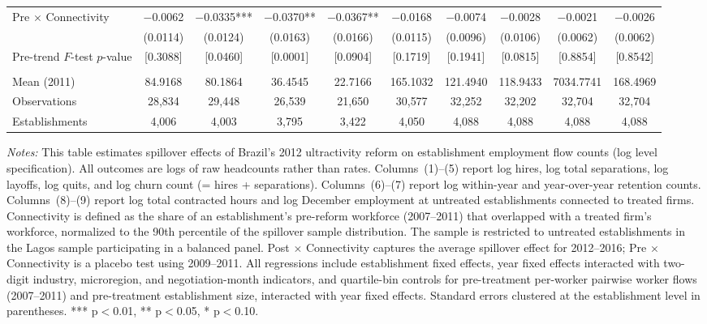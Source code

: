 \documentclass[12pt,letterpaper]{article}
\begin{document}
\begin{table}[]
\begin{threeparttable}
\begin{tabular}{lccccccccc}
Pre $\times$ Connectivity & $-$0.0062 & $-$0.0335*** & $-$0.0370** & $-$0.0367** & $-$0.0168 & $-$0.0074 & $-$0.0028 & $-$0.0021 & $-$0.0026 \\
  & (0.0114) & (0.0124) & (0.0163) & (0.0166) & (0.0115) & (0.0096) & (0.0106) & (0.0062) & (0.0062) \\
Pre-trend $F$-test $p$-value & [0.3088] & [0.0460] & [0.0001] & [0.0904] & [0.1719] & [0.1941] & [0.0815] & [0.8854] & [0.8542] \\
  &  &  &  &  &  &  &  &  & \\
Mean (2011) & 84.9168 & 80.1864 & 36.4545 & 22.7166 & 165.1032 & 121.4940 & 118.9433 & 7034.7741 & 168.4969 \\
Observations & 28{,}834 & 29{,}448 & 26{,}539 & 21{,}650 & 30{,}577 & 32{,}252 & 32{,}202 & 32{,}704 & 32{,}704 \\
Establishments & 4{,}006 & 4{,}003 & 3{,}795 & 3{,}422 & 4{,}050 & 4{,}088 & 4{,}088 & 4{,}088 & 4{,}088 \\
\bottomrule
\end{tabular}
\scriptsize
\begin{tablenotes}
\item \textit{Notes:} This table estimates spillover effects of Brazil's 2012 ultractivity reform on establishment employment flow counts (log level specification). All outcomes are logs of raw headcounts rather than rates. Columns~(1)--(5) report log hires, log total separations, log layoffs, log quits, and log churn count (= hires + separations). Columns~(6)--(7) report log within-year and year-over-year retention counts. Columns~(8)--(9) report log total contracted hours and log December employment at untreated establishments connected to treated firms. Connectivity is defined as the share of an establishment's pre-reform workforce (2007--2011) that overlapped with a treated firm's workforce, normalized to the 90th percentile of the spillover sample distribution. The sample is restricted to untreated establishments in the Lagos sample participating in a balanced panel. Post $\times$ Connectivity captures the average spillover effect for 2012--2016; Pre $\times$ Connectivity is a placebo test using 2009--2011. All regressions include establishment fixed effects, year fixed effects interacted with two-digit industry, microregion, and negotiation-month indicators, and quartile-bin controls for pre-treatment per-worker pairwise worker flows (2007--2011) and pre-treatment establishment size, interacted with year fixed effects. Standard errors clustered at the establishment level in parentheses. *** p$<$0.01, ** p$<$0.05, * p$<$0.10.
\end{tablenotes}
\end{threeparttable}
\end{table}

\clearpage
\end{document}
